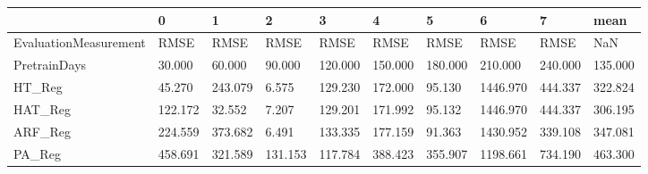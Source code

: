 \begin{tabular}{llllllllll}
\toprule
{} &       0 &       1 &       2 &       3 &       4 &       5 &        6 &       7 &    mean \\
\midrule
EvaluationMeasurement &    RMSE &    RMSE &    RMSE &    RMSE &    RMSE &    RMSE &     RMSE &    RMSE &     NaN \\
PretrainDays          &  30.000 &  60.000 &  90.000 & 120.000 & 150.000 & 180.000 &  210.000 & 240.000 & 135.000 \\
HT\_Reg                &  45.270 & 243.079 &   6.575 & 129.230 & 172.000 &  95.130 & 1446.970 & 444.337 & 322.824 \\
HAT\_Reg               & 122.172 &  32.552 &   7.207 & 129.201 & 171.992 &  95.132 & 1446.970 & 444.337 & 306.195 \\
ARF\_Reg               & 224.559 & 373.682 &   6.491 & 133.335 & 177.159 &  91.363 & 1430.952 & 339.108 & 347.081 \\
PA\_Reg                & 458.691 & 321.589 & 131.153 & 117.784 & 388.423 & 355.907 & 1198.661 & 734.190 & 463.300 \\
\bottomrule
\end{tabular}
